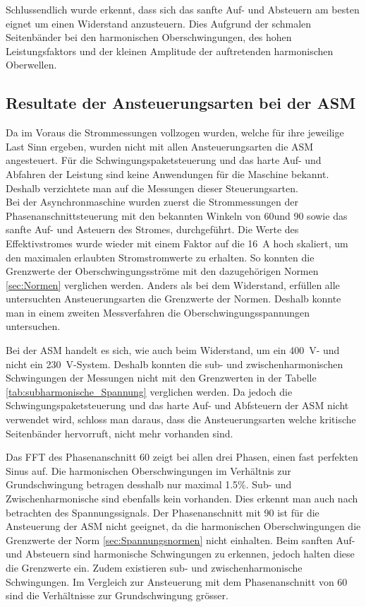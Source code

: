 Schlussendlich wurde erkennt, dass sich das sanfte Auf- und Absteuern am besten eignet um einen Widerstand anzusteuern. Dies Aufgrund der schmalen Seitenbänder bei den harmonischen Oberschwingungen, des hohen Leistungsfaktors und der kleinen Amplitude der auftretenden harmonischen Oberwellen. 

\subsection{Resultate der Ansteuerungsarten bei der ASM}
Da im Voraus die Strommessungen vollzogen wurden, welche für ihre jeweilige Last Sinn ergeben, wurden nicht mit allen Ansteuerungsarten die ASM angesteuert. Für die Schwingungspaketsteuerung und das harte Auf- und Abfahren der Leistung sind keine Anwendungen für die Maschine bekannt. Deshalb verzichtete man auf die Messungen dieser Steuerungsarten.\\

Bei der Asynchronmaschine wurden zuerst die Strommessungen der Phasenanschnittsteuerung mit den bekannten Winkeln von 60\textdegree und 90\textdegree \hspace{0.02cm} sowie das sanfte Auf- und Asteuern des Stromes, durchgeführt. Die Werte des Effektivstromes wurde wieder mit einem Faktor auf die \SI{16}{A} hoch skaliert, um den maximalen erlaubten Stromstromwerte zu erhalten. So konnten die Grenzwerte der Oberschwingungsströme mit den dazugehörigen Normen \ref{sec:Normen} verglichen werden. Anders als bei dem Widerstand, erfüllen alle untersuchten Ansteuerungsarten die Grenzwerte der Normen. Deshalb konnte man in einem zweiten Messverfahren die Oberschwingungsspannungen untersuchen.

Bei der ASM handelt es sich, wie auch beim Widerstand, um ein \SI{400}{V}- und nicht ein \SI{230}{V}-System. Deshalb konnten die sub- und zwischenharmonischen Schwingungen der Messungen nicht mit den Grenzwerten in der Tabelle \ref{tab:subharmonische_Spannung} verglichen werden.
Da jedoch die Schwingungspaketsteuerung und das harte Auf- und Abfsteuern der ASM nicht verwendet wird, schloss man daraus, dass die Ansteuerungsarten welche kritische Seitenbänder hervorruft, nicht mehr vorhanden sind. 


Das FFT des Phasenanschnitt 60\textdegree \hspace{0.02cm} zeigt bei allen drei Phasen, einen fast perfekten Sinus auf.
Die harmonischen Oberschwingungen im Verhältnis zur Grundschwingung betragen desshalb nur maximal 1.5\%. Sub- und Zwischenharmonische sind ebenfalls kein vorhanden. Dies erkennt man auch nach betrachten des Spannungssignals.
Der Phasenanschnitt mit 90\textdegree \hspace{0.02cm} ist für die Ansteuerung der ASM nicht geeignet, da die harmonischen Oberschwingungen die Grenzwerte der Norm \ref{sec:Spannungsnormen} nicht einhalten. 
Beim sanften Auf- und Absteuern sind harmonische Schwingungen zu erkennen, jedoch halten diese die Grenzwerte ein. Zudem existieren sub- und zwischenharmonische Schwingungen. Im Vergleich zur Ansteuerung mit dem Phasenanschnitt von 60\textdegree \hspace{0.02cm} sind die Verhältnisse zur Grundschwingung grösser.\\ 

